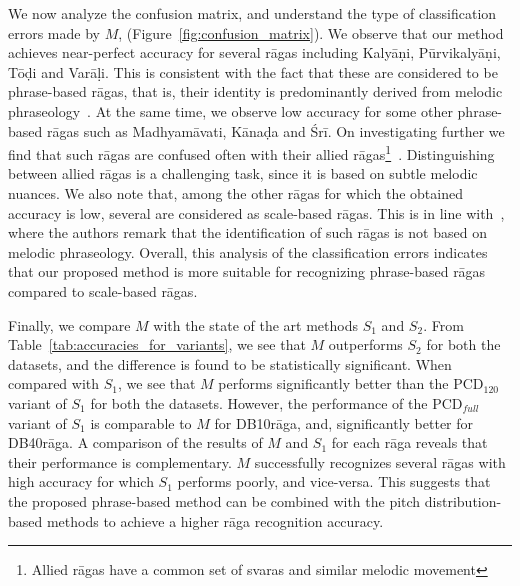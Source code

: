 We now analyze the confusion matrix, and understand the type of classification errors made by $M$, (Figure~\ref{fig:confusion_matrix}). We observe that our method achieves near-perfect accuracy for several r\={a}gas including Kaly\={a}\d{n}i, P\={u}rvikaly\={a}\d{n}i, T\={o}\d{d}i and Var\={a}\d{l}i. This is consistent with the fact that these are considered to be phrase-based r\={a}gas, that is, their identity is predominantly derived from melodic phraseology~\cite{krishna2012carnatic}. At the same time, we observe low accuracy for some other phrase-based r\={a}gas such as Madhyam\={a}vati, K\={a}na\d{d}a and \'{S}r\={i}. On investigating further we find that such r\={a}gas are confused often with their allied r\={a}gas\footnote{Allied r\={a}gas have a common set of svaras and similar melodic movement}~\cite{krishna2012carnatic}. Distinguishing between allied r\={a}gas is a challenging task, since it is based on subtle melodic nuances. We also note that, among the other r\={a}gas for which the obtained accuracy is low, several are considered as scale-based r\={a}gas. This is in line with~\cite{krishna2012carnatic}, where the authors remark that the identification of such r\={a}gas is not based on melodic phraseology. Overall, this analysis of the classification errors indicates that our proposed method is more suitable for recognizing phrase-based r\={a}gas compared to scale-based r\={a}gas. 


Finally, we compare $M$ with the state of the art methods $S_1$ and $S_2$. From Table~\ref{tab:accuracies_for_variants}, we see that $M$ outperforms $S_2$ for both the datasets, and the difference is found to be statistically significant. When compared with $S_1$, we see that $M$ performs significantly better than the $\mathrm{PCD}_{120}$ variant of $S_1$ for both the datasets. However, the performance of the $\mathrm{PCD}_{full}$ variant of $S_1$ is comparable to $M$ for DB10r\={a}ga, and, significantly better for DB40r\={a}ga. A comparison of the results of $M$ and $S_1$ for each r\={a}ga reveals that their performance is complementary. $M$ successfully recognizes several r\={a}gas with high accuracy for which $S_1$ performs poorly, and vice-versa. This suggests that the proposed phrase-based method can be combined with the pitch distribution-based methods to achieve a higher r\={a}ga recognition accuracy.



%


